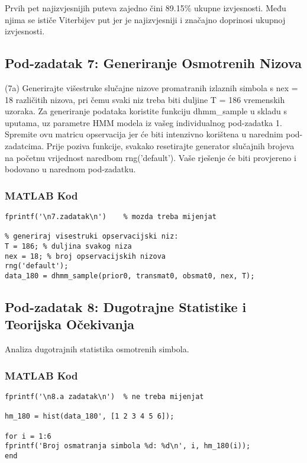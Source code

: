 \documentclass[12pt]{article}
\begin{document}
	Prvih pet najizvjesnijih puteva zajedno čini 89.15\% ukupne izvjesnosti. Među njima se ističe Viterbijev put jer je najizvjesniji i značajno doprinosi ukupnoj izvjesnosti.
	
	\subsection{Pod-zadatak 7: Generiranje Osmotrenih Nizova}
	
	(7a) Generirajte višestruke slučajne nizove promatranih izlaznih simbola s nex = 18 različitih nizova, pri čemu svaki niz treba biti duljine T = 186 vremenskih uzoraka. Za generiranje podataka koristite funkciju dhmm\_sample u skladu s uputama, uz parametre HMM modela iz vašeg individualnog pod-zadatka 1. Spremite ovu matricu opservacija jer će biti intenzivno korištena u narednim pod-zadatcima. Prije poziva funkcije, svakako resetirajte generator slučajnih brojeva na početnu vrijednost naredbom rng('default'). Vaše rješenje će biti provjereno i bodovano u narednom pod-zadatku.
	
	\subsubsection*{MATLAB Kod}
	\begin{lstlisting}
fprintf('\n7.zadatak\n')    % mozda treba mijenjat

% generiraj visestruki opservacijski niz:
T = 186; % duljina svakog niza
nex = 18; % broj opservacijskih nizova
rng('default');
data_180 = dhmm_sample(prior0, transmat0, obsmat0, nex, T);
	\end{lstlisting}
	
	\subsection{Pod-zadatak 8: Dugotrajne Statistike i Teorijska Očekivanja}
	Analiza dugotrajnih statistika osmotrenih simbola.
	
	\subsubsection*{MATLAB Kod}
	\begin{lstlisting}
fprintf('\n8.a zadatak\n')  % ne treba mijenjat

hm_180 = hist(data_180', [1 2 3 4 5 6]);

for i = 1:6
fprintf('Broj osmatranja simbola %d: %d\n', i, hm_180(i));
end
	\end{lstlisting}
	
\end{document}
